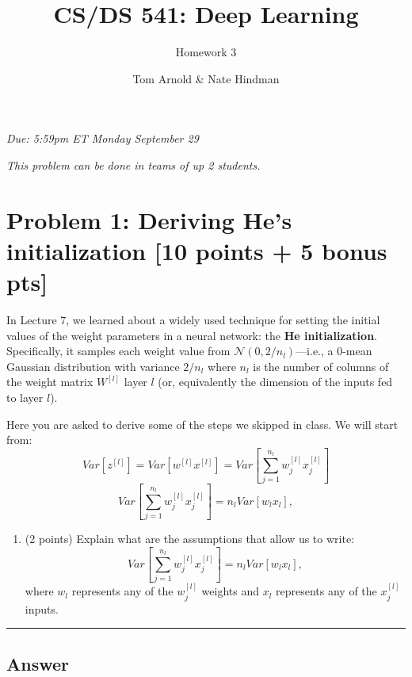 \documentclass[
  letterpaper,
  DIV=11,
  numbers=noendperiod]{scrartcl}
\title{CS/DS 541: Deep Learning}
\subtitle{Homework 3}
\author{Tom Arnold \& Nate Hindman}
\date{}
\providecommand{\tightlist}{%
  \setlength{\itemsep}{0pt}\setlength{\parskip}{0pt}}\usepackage{longtable,booktabs,array}
\newcommand{\btwocol}{\begin{multicols}{2}}
\newcommand{\etwocol}{\end{multicols}}
\begin{document}
\maketitle



\btwocol

\emph{Due: 5:59pm ET Monday September 29}

\emph{This problem can be done in teams of up 2 students.}

\etwocol

\section{Problem 1: Deriving He's initialization {[}10 points + 5 bonus
pts{]}}\label{problem-1-deriving-hes-initialization-10-points-5-bonus-pts}

In Lecture 7, we learned about a widely used technique for setting the
initial values of the weight parameters in a neural network: the
\textbf{He initialization}. Specifically, it samples each weight value
from \(\mathcal{N}(0,2/n_{l})\)---i.e., a 0-mean Gaussian distribution
with variance \(2/n_{l}\) where \(n_{l}\) is the number of columns of
the weight matrix \(W^{[l]}\) layer \(l\) (or, equivalently the
dimension of the inputs fed to layer \(l\)).

Here you are asked to derive some of the steps we skipped in class. We
will start from:
\[Var[z^{[l]}]=Var[w^{[l]}x^{[l]}]=Var[\sum_{j=1}^{n_{l}}w_{j}^{[l]}x_{j}^{[l]}]\]
\[Var[\sum_{j=1}^{n_{l}}w_{j}^{[l]}x_{j}^{[l]}]=n_{l}Var[w_{l}x_{l}],\]

\begin{enumerate}
\def\labelenumi{\arabic{enumi}.}
\tightlist
\item
  (2 points) Explain what are the assumptions that allow us to write:
  \[Var[\sum_{j=1}^{n_{l}}w_{j}^{[l]}x_{j}^{[l]}]=n_{l}Var[w_{l}x_{l}],\]
  where \(w_{l}\) represents any of the \(w_{j}^{[l]}\) weights and
  \(x_{l}\) represents any of the \(x_{j}^{[l]}\) inputs.
\end{enumerate}

\begin{center}\rule{0.5\linewidth}{0.5pt}\end{center}

\subsection{Answer}\label{answer}
\end{document}
